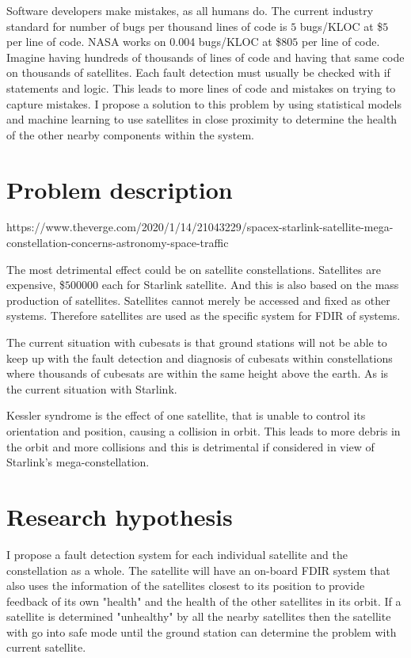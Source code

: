 Software developers make mistakes, as all humans do. The current industry standard for number of bugs per thousand lines of code is $5$ bugs/KLOC at \$$5$ per line of code. NASA works on 0.004 bugs/KLOC at \$$805$ per line of code. Imagine having hundreds of thousands of lines of code and having that same code on thousands of satellites. Each fault detection must usually be checked with if statements and logic. This leads to more lines of code and mistakes on trying to capture mistakes. I propose a solution to this problem by using statistical models and machine learning to use satellites in close proximity to determine the health of the other nearby components within the system.

\section{Problem description}

https://www.theverge.com/2020/1/14/21043229/spacex-starlink-satellite-mega-constellation-concerns-astronomy-space-traffic

The most detrimental effect could be on satellite constellations. Satellites are expensive, \$$500 000$ each for Starlink satellite. And this is also based on the mass production of satellites. Satellites cannot merely be accessed and fixed as other systems. Therefore satellites are used as the specific system for FDIR of systems.

The current situation with cubesats is that ground stations will not be able to keep up with the fault detection and diagnosis of cubesats within constellations where thousands of cubesats are within the same height above the earth. As is the current situation with Starlink.

Kessler syndrome is the effect of one satellite, that is unable to control its orientation and position, causing a collision in orbit. This leads to more debris in the orbit and more collisions and this is detrimental if considered in view of Starlink's mega-constellation.

\section{Research hypothesis}
I propose a fault detection system for each individual satellite and the constellation as a whole. The satellite will have an on-board FDIR system that also uses the information of the satellites closest to its position to provide feedback of its own "health" and the health of the other satellites in its orbit. If a satellite is determined "unhealthy" by all the nearby satellites then the satellite with go into safe mode until the ground station can determine the problem with current satellite.

